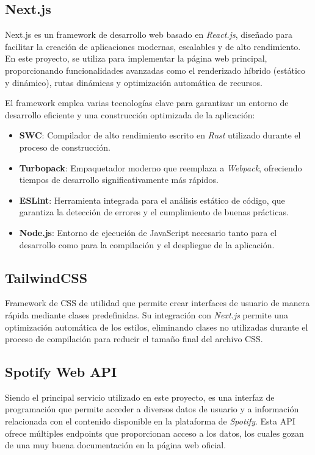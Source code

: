 \subsection{Next.js}
Next.js es un framework de desarrollo web basado en \textit{React.js}, diseñado para facilitar la creación de aplicaciones modernas, escalables y de alto rendimiento. En este proyecto, se utiliza para implementar la página web principal, proporcionando funcionalidades avanzadas como el renderizado híbrido (estático y dinámico), rutas dinámicas y optimización automática de recursos.

El framework emplea varias tecnologías clave para garantizar un entorno de desarrollo eficiente y una construcción optimizada de la aplicación:
\begin{itemize}
    \item \textbf{SWC}: Compilador de alto rendimiento escrito en \textit{Rust} utilizado durante el proceso de construcción.
    \item \textbf{Turbopack}: Empaquetador moderno que reemplaza a \textit{Webpack}, ofreciendo tiempos de desarrollo significativamente más rápidos.
    \item \textbf{ESLint}: Herramienta integrada para el análisis estático de código, que garantiza la detección de errores y el cumplimiento de buenas prácticas.
    \item \textbf{Node.js}: Entorno de ejecución de JavaScript necesario tanto para el desarrollo como para la compilación y el despliegue de la aplicación.
\end{itemize}

\subsection{TailwindCSS}
Framework de CSS de utilidad que permite crear interfaces de usuario de manera rápida mediante clases predefinidas. Su integración con \textit{Next.js} permite una optimización automática de los estilos, eliminando clases no utilizadas durante el proceso de compilación para reducir el tamaño final del archivo CSS.

\subsection{Spotify Web API}
Siendo el principal servicio utilizado en este proyecto, es una interfaz de programación que permite acceder a diversos datos de usuario y a información relacionada con el contenido disponible en la plataforma de \textit{Spotify}. Esta API ofrece múltiples endpoints que proporcionan acceso a los datos, los cuales gozan de una muy buena documentación en la página web oficial.

